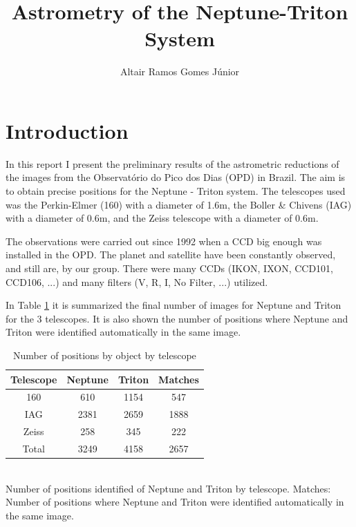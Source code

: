 \documentclass[12pt,a4paper]{report}
\author{Altair Ramos Gomes Júnior}
\title{Astrometry of the Neptune-Triton System}
\newcommand{\PE}{Perkin-Elmer }
\newcommand{\BC}{Boller \& Chivens }
\begin{document}
\maketitle

\pagestyle{headings}

\section*{Introduction}

In this report I present the preliminary results of the astrometric reductions of the images from the Observatório do Pico dos Dias (OPD) in Brazil. The aim is to obtain precise positions for the Neptune - Triton system. The telescopes used was the \PE (160) with a diameter of 1.6m, the \BC (IAG) with a diameter of 0.6m, and the Zeiss telescope with a diameter of 0.6m.

The observations were carried out since 1992 when a CCD big enough was installed in the OPD. The planet and satellite have been constantly observed, and still are, by our group. There were many CCDs (IKON, IXON, CCD101, CCD106, ...) and many filters (V, R, I, No Filter, ...) utilized.


In Table \ref{Tab:dados} it is summarized the final number of images for Neptune and Triton for the 3 telescopes. It is also shown the number of positions where Neptune and Triton were identified automatically in the same image.

\begin{table}[h]
\centering
\caption{Number of positions by object by telescope}
\label{Tab:dados}
\begin{tabular}{|c|c|c|c|}
\hline 
Telescope & Neptune & Triton & Matches \\ 
\hline
160 & 610 & 1154 & 547 \\ 
\hline 
IAG & 2381 & 2659 & 1888 \\ 
\hline 
Zeiss & 258 & 345 & 222 \\ 
\hline 
Total & 3249 & 4158 & 2657 \\ 
\hline 
\end{tabular}
\\Number of positions identified of Neptune and Triton by telescope. Matches: Number of positions where Neptune and Triton were identified automatically in the same image.
\end{table}
\end{document}
